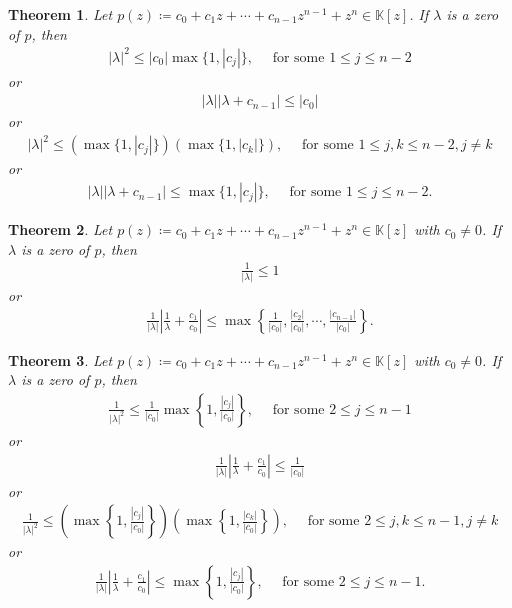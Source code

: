 \documentclass{amsart}
\newtheorem{theorem}{Theorem}[section]
\begin{document}
\begin{theorem} 
	Let $p(z)\coloneqq c_0+c_1z+\cdots +c_{n-1}z^{n-1}+z^n \in \mathbb{K}[z]$.  If $\lambda$ is a  zero of $p$, then 
	\begin{align*}
		|\lambda|^2\leq |c_0|\max\{1, |c_j|\},  \quad \text{ for some } 1\leq j \leq n-2
	\end{align*}
	or 
	\begin{align*}
		|\lambda||\lambda +c_{n-1}|\leq |c_0|
	\end{align*}
	or 
	\begin{align*}
		|\lambda|^2\leq \left(\max\{1, |c_j|\}\right)\left(\max\{1, |c_k|\}\right), \quad \text{ for some } 1\leq j, k \leq n-2, j \neq k
	\end{align*}
	or 
	\begin{align*}
		|\lambda||\lambda +c_{n-1}|\leq \max\{1, |c_j|\},  \quad \text{ for some } 1\leq j \leq n-2.
	\end{align*}
\end{theorem}
\begin{theorem} 
	Let $p(z)\coloneqq c_0+c_1z+\cdots +c_{n-1}z^{n-1}+z^n \in \mathbb{K}[z]$ with $c_0\neq 0$.  If $\lambda$ is a  zero of $p$, then 
	\begin{align*}
	\frac{1}{|\lambda|}\leq 1
	\end{align*}
	or 
	\begin{align*}
		\frac{1}{|\lambda|}\left|\frac{1}{\lambda}+\frac{c_1}{c_0}\right|	\leq \max\left\{\frac{1}{|c_0|}, 	\frac{|c_2|}{|c_0|}, \cdots,	\frac{|c_{n-1}|}{|c_0|}\right\}.
	\end{align*}
\end{theorem}
\begin{theorem} 
	Let $p(z)\coloneqq c_0+c_1z+\cdots +c_{n-1}z^{n-1}+z^n \in \mathbb{K}[z]$ with $c_0\neq 0$.  If $\lambda$ is a  zero of $p$, then 
	\begin{align*}
		\frac{1}{|\lambda|^2}\leq 	\frac{1}{|c_0|}\max\left\{1, 	\frac{|c_j|}{|c_0|}\right\},  \quad \text{ for some } 2\leq j \leq n-1
	\end{align*}
	or 
	\begin{align*}
		\frac{1}{|\lambda|}	\left|\frac{1}{\lambda}+\frac{c_1}{c_0}\right|\leq \frac{1}{|c_0|}
	\end{align*}
	or 
	\begin{align*}
		\frac{1}{|\lambda|^2}\leq \left(\max\left\{1, \frac{|c_j|}{|c_0|}\right\}\right)\left(\max\left\{1, \frac{|c_k|}{|c_0|}\right\}\right), \quad \text{ for some } 2\leq j, k \leq n-1, j \neq k
	\end{align*}
	or 
	\begin{align*}
		\frac{1}{|\lambda|}	\left|\frac{1}{\lambda}+\frac{c_1}{c_0}\right|\leq \max\left\{1, \frac{|c_j|}{|c_0|}\right\},  \quad \text{ for some } 2\leq j \leq n-1.
	\end{align*}
\end{theorem}
\end{document}
